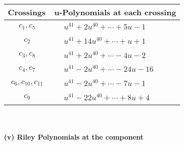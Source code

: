 \documentclass[1p]{elsarticle_modified}
\theoremstyle{definition}
\begin{document}
\begin{tabular}{m{50pt}|m{274pt}}
Crossings & \hspace{64pt}u-Polynomials at each crossing \\
\hline $$\begin{aligned}c_{1},c_{5}\end{aligned}$$&$\begin{aligned}
&u^{41}+2 u^{40}+\cdots+5 u-1
\end{aligned}$\\
\hline $$\begin{aligned}c_{2}\end{aligned}$$&$\begin{aligned}
&u^{41}+14 u^{40}+\cdots+u+1
\end{aligned}$\\
\hline $$\begin{aligned}c_{3},c_{8}\end{aligned}$$&$\begin{aligned}
&u^{41}+2 u^{40}+\cdots-4 u-2
\end{aligned}$\\
\hline $$\begin{aligned}c_{4},c_{7}\end{aligned}$$&$\begin{aligned}
&u^{41}-2 u^{40}+\cdots-24 u-16
\end{aligned}$\\
\hline $$\begin{aligned}c_{6},c_{10},c_{11}\end{aligned}$$&$\begin{aligned}
&u^{41}-2 u^{40}+\cdots-7 u-1
\end{aligned}$\\
\hline $$\begin{aligned}c_{9}\end{aligned}$$&$\begin{aligned}
&u^{41}-22 u^{40}+\cdots+8 u+4
\end{aligned}$\\
\hline
\end{tabular}\\~\\
\newpage\renewcommand{\arraystretch}{1}
\flushleft \textbf{(v) Riley Polynomials at the component}\newline \\
\end{document}
